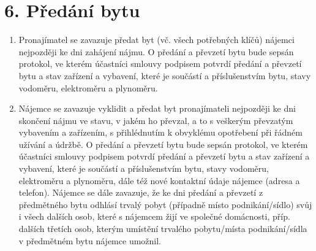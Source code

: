 \section*{6. Předání bytu}

\begin{enumerate}[label=\arabic*.]
    \item Pronajímatel se zavazuje předat byt (vč. všech potřebných klíčů) nájemci nejpozději ke dni zahájení nájmu. O předání a převzetí bytu bude sepsán protokol, ve kterém účastníci smlouvy podpisem potvrdí předání a převzetí bytu a stav zařízení a vybavení, které je součástí a příslušenstvím bytu, stavy vodoměru, elektroměru a plynoměru.
    \item Nájemce se zavazuje vyklidit a předat byt pronajímateli nejpozději ke dni skončení nájmu ve stavu, v jakém ho převzal, a to s veškerým převzatým vybavením a zařízením, s přihlédnutím k obvyklému opotřebení při řádném užívání a údržbě. O předání a převzetí bytu bude sepsán protokol, ve kterém účastníci smlouvy podpisem potvrdí předání a převzetí bytu a stav zařízení a vybavení, které je součástí a příslušenstvím bytu, stavy vodoměru, elektroměru a plynoměru, dále též nové kontaktní údaje nájemce (adresa a telefon). Nájemce se dále zavazuje, že ke dni předání a převzetí z předmětného bytu odhlásí trvalý pobyt (případně místo podnikání/sídlo) svůj i všech dalších osob, které s nájemcem žijí ve společné domácnosti, příp. dalších třetích osob, kterým umístění trvalého pobytu/místa podnikání/sídla v předmětném bytu nájemce umožnil.
\end{enumerate}
